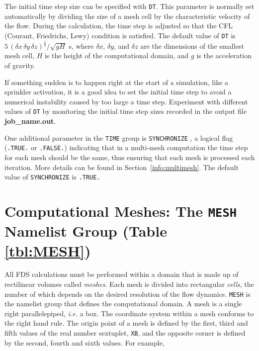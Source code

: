 \documentclass[11pt]{book}
\newcommand{\ct}{\tt\small}
\newcommand{\dx}{\delta x}
\newcommand{\dy}{\delta y}
\newcommand{\dz}{\delta z}
\newcommand{\ot}{\frac{1}{3}}
\begin{document}
The initial time step size can be specified with
{\ct DT}. This parameter is normally set automatically by dividing the size of a mesh cell by the
characteristic velocity of the flow.
During the calculation, the time step is adjusted so that the CFL (Courant, Friedrichs, Lewy) condition is
satisfied. The default value of {\ct DT} is $5 \, (\dx \, \dy \, \dz)^\ot/\sqrt{gH}$ s, where
$\dx$, $\dy$, and $\dz$ are the dimensions of the smallest mesh
cell, $H$ is the height of the computational domain, and $g$ is the acceleration of gravity.

\begin{warning}
If something sudden is to happen right at the start of a simulation,
like a sprinkler activation, it is a good idea to set the initial time step
to avoid a numerical instability caused by too large a time step.
Experiment with different values of {\ct DT} by monitoring the initial time step sizes
recorded in the output file {\bf job\_name.out}.
\end{warning}

\noindent
One additional parameter in the {\ct TIME} group is {\ct SYNCHRONIZE} , a
logical flag ({\ct .TRUE.} or {\ct .FALSE.}) indicating that in a
multi-mesh computation the time step for each mesh should be the same, thus
ensuring that each mesh is processed each iteration. More details can
be found in Section~\ref{info:multimesh}. The default value of {\ct SYNCHRONIZE} is {\ct .TRUE.}

\newpage

\section{Computational Meshes: The \texorpdfstring{{\tt MESH}}{MESH} Namelist Group (Table \ref{tbl:MESH})}
\label{info:MESH}

All FDS calculations must be performed within a domain that is made up
of rectilinear volumes called {\em meshes}. Each mesh is divided into rectangular {\em cells},
the number of which depends on the desired resolution of the flow dynamics.
{\ct MESH} is the namelist group that defines the computational domain.
A mesh is a single right parallelepiped, {\em i.e.} a box.
The coordinate system within a mesh conforms to the right hand rule.
The origin point of a mesh is defined by the first, third
and fifth values of the real number sextuplet, {\ct XB}, and the opposite
corner is defined by the second, fourth and sixth values.
For example,
\end{document}
